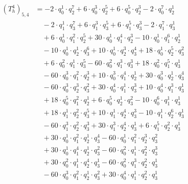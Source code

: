 \begin{align*}(T_{h}^4)_{5,4}&=-2\cdot q_0^{1}\cdot q_2^{7}+6\cdot q_0^{3}\cdot q_2^{5}+6\cdot q_0^{5}\cdot q_2^{3}-2\cdot q_0^{7}\cdot q_2^{1}\\
&\quad -2\cdot q_1^{1}\cdot q_3^{7}+6\cdot q_1^{3}\cdot q_3^{5}+6\cdot q_1^{5}\cdot q_3^{3}-2\cdot q_1^{7}\cdot q_3^{1}\\
&\quad +6\cdot q_0^{1}\cdot q_1^{2}\cdot q_2^{5}+30\cdot q_0^{1}\cdot q_1^{4}\cdot q_2^{3}-10\cdot q_0^{1}\cdot q_1^{6}\cdot q_2^{1}\\
&\quad -10\cdot q_0^{1}\cdot q_2^{1}\cdot q_3^{6}+10\cdot q_0^{1}\cdot q_2^{3}\cdot q_3^{4}+18\cdot q_0^{1}\cdot q_2^{5}\cdot q_3^{2}\\
&\quad +6\cdot q_0^{2}\cdot q_1^{1}\cdot q_3^{5}-60\cdot q_0^{2}\cdot q_1^{3}\cdot q_3^{3}+18\cdot q_0^{2}\cdot q_1^{5}\cdot q_3^{1}\\
&\quad -60\cdot q_0^{3}\cdot q_1^{2}\cdot q_2^{3}+10\cdot q_0^{3}\cdot q_1^{4}\cdot q_2^{1}+30\cdot q_0^{3}\cdot q_2^{1}\cdot q_3^{4}\\
&\quad -60\cdot q_0^{3}\cdot q_2^{3}\cdot q_3^{2}+30\cdot q_0^{4}\cdot q_1^{1}\cdot q_3^{3}+10\cdot q_0^{4}\cdot q_1^{3}\cdot q_3^{1}\\
&\quad +18\cdot q_0^{5}\cdot q_1^{2}\cdot q_2^{1}+6\cdot q_0^{5}\cdot q_2^{1}\cdot q_3^{2}-10\cdot q_0^{6}\cdot q_1^{1}\cdot q_3^{1}\\
&\quad +18\cdot q_1^{1}\cdot q_2^{2}\cdot q_3^{5}+10\cdot q_1^{1}\cdot q_2^{4}\cdot q_3^{3}-10\cdot q_1^{1}\cdot q_2^{6}\cdot q_3^{1}\\
&\quad -60\cdot q_1^{3}\cdot q_2^{2}\cdot q_3^{3}+30\cdot q_1^{3}\cdot q_2^{4}\cdot q_3^{1}+6\cdot q_1^{5}\cdot q_2^{2}\cdot q_3^{1}\\
&\quad +30\cdot q_0^{1}\cdot q_1^{2}\cdot q_2^{1}\cdot q_3^{4}-60\cdot q_0^{1}\cdot q_1^{2}\cdot q_2^{3}\cdot q_3^{2}\\
&\quad +30\cdot q_0^{1}\cdot q_1^{4}\cdot q_2^{1}\cdot q_3^{2}-60\cdot q_0^{2}\cdot q_1^{1}\cdot q_2^{2}\cdot q_3^{3}\\
&\quad +30\cdot q_0^{2}\cdot q_1^{1}\cdot q_2^{4}\cdot q_3^{1}-60\cdot q_0^{2}\cdot q_1^{3}\cdot q_2^{2}\cdot q_3^{1}\\
&\quad -60\cdot q_0^{3}\cdot q_1^{2}\cdot q_2^{1}\cdot q_3^{2}+30\cdot q_0^{4}\cdot q_1^{1}\cdot q_2^{2}\cdot q_3^{1}\end{align*}
